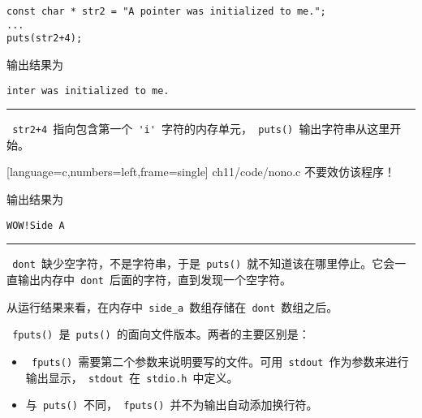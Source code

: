 \begin{frame}[fragile] 
\begin{lstlisting}[basicstyle=\ttfamily]
const char * str2 = "A pointer was initialized to me.";
...
puts(str2+4);
\end{lstlisting}
输出结果为
\begin{lstlisting}[basicstyle=\ttfamily]
inter was initialized to me.
\end{lstlisting} 
\pause \rule{\textwidth}{0.3mm} \vspace{0.1mm}

\lstinline| str2+4 |指向包含第一个\lstinline| 'i' |字符的内存单元，\lstinline| puts() |输出字符串从这里开始。
\end{frame}

\begin{frame}[fragile] 

[language=c,numbers=left,frame=single]
{ch11/code/nono.c}
\pause 
不要效仿该程序！
\end{frame}

\begin{frame}[fragile]
输出结果为
\begin{lstlisting}[basicstyle=\ttfamily]
WOW!Side A
\end{lstlisting} 
\pause \rule{\textwidth}{0.3mm} \vspace{0.1mm}

\lstinline| dont |缺少空字符，不是字符串，于是\lstinline| puts() |就不知道该在哪里停止。它会一直输出内存中\lstinline| dont |后面的字符，直到发现一个空字符。\vspace{0.1mm}

从运行结果来看，在内存中\lstinline| side_a |数组存储在\lstinline| dont |数组之后。
\end{frame}

\begin{frame}[fragile] 
\lstinline| fputs() |是\lstinline| puts() |的面向文件版本。两者的主要区别是：\vspace{0.1mm}

\begin{itemize}
\item
\lstinline| fputs() |需要第二个参数来说明要写的文件。可用\lstinline| stdout |作为参数来进行输出显示，\lstinline| stdout |在\lstinline| stdio.h |中定义。 \\[0.1in]
\item 
与\lstinline| puts() |不同，\lstinline| fputs() |并不为输出自动添加换行符。
\end{itemize}
\end{frame}

